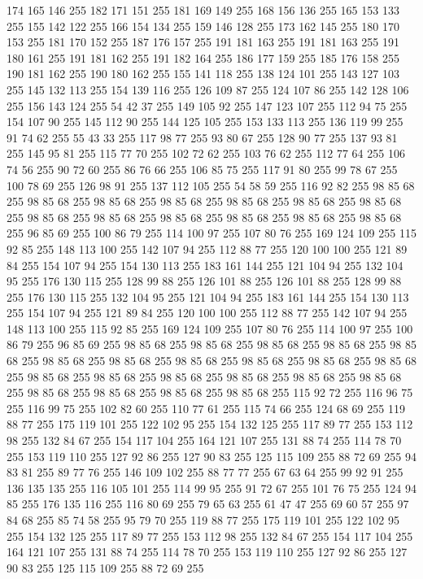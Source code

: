 174 165 146 255 182 171 151 255 181 169 149 255 168 156 136 255 165 153 133 255 155 142 122 255 166 154 134 255 159 146 128 255 173 162 145 255 180 170 153 255 181 170 152 255 187 176 157 255 191 181 163 255 191 181 163 255 191 180 161 255 191 181 162 255 191 182 164 255 186 177 159 255 185 176 158 255 190 181 162 255 190 180 162 255 155 141 118 255 138 124 101 255 143 127 103 255 145 132 113 255 154 139 116 255 126 109 87 255 124 107 86 255 142 128 106 255 156 143 124 255 54 42 37 255 149 105 92 255 147 123 107 255 112 94 75 255 154 107 90 255 145 112 90 255 144 125 105 255 153 133 113 255 136 119 99 255 91 74 62 255 55 43 33 255 117 98 77 255 93 80 67 255 128 90 77 255 137 93 81 255 145 95 81 255 115 77 70 255 102 72 62 255 103 76 62 255 112 77 64 255 106 74 56 255 90 72 60 255 86 76 66 255 106 85 75 255 117 91 80 255 99 78 67 255 100 78 69 255 126 98 91 255 137 112 105 255 54 58 59 255 116 92 82 255 98 85 68 255 98 85 68 255 98 85 68 255
98 85 68 255 98 85 68 255 98 85 68 255 98 85 68 255 98 85 68 255 98 85 68 255 98 85 68 255 98 85 68 255 98 85 68 255 98 85 68 255 96 85 69 255 100 86 79 255 114 100 97 255 107 80 76 255 169 124 109 255 115 92 85 255 148 113 100 255 142 107 94 255 112 88 77 255 120 100 100 255 121 89 84 255 154 107 94 255 154 130 113 255 183 161 144 255 121 104 94 255 132 104 95 255 176 130 115 255 128 99 88 255 126 101 88 255 126 101 88 255 128 99 88 255 176 130 115 255 132 104 95 255 121 104 94 255 183 161 144 255 154 130 113 255 154 107 94 255 121 89 84 255 120 100 100 255 112 88 77 255 142 107 94 255 148 113 100 255 115 92 85 255 169 124 109 255 107 80 76 255 114 100 97 255 100 86 79 255 96 85 69 255 98 85 68 255 98 85 68 255 98 85 68 255 98 85 68 255 98 85 68 255 98 85 68 255 98 85 68 255 98 85 68 255 98 85 68 255 98 85 68 255 98 85 68 255 98 85 68 255 98 85 68 255 98 85 68 255 98 85 68 255 98 85 68 255
98 85 68 255 98 85 68 255 98 85 68 255 98 85 68 255 98 85 68 255 115 92 72 255 116 96 75 255 116 99 75 255 102 82 60 255 110 77 61 255 115 74 66 255 124 68 69 255 119 88 77 255 175 119 101 255 122 102 95 255 154 132 125 255 117 89 77 255 153 112 98 255 132 84 67 255 154 117 104 255 164 121 107 255 131 88 74 255 114 78 70 255 153 119 110 255 127 92 86 255 127 90 83 255 125 115 109 255 88 72 69 255 94 83 81 255 89 77 76 255 146 109 102 255 88 77 77 255 67 63 64 255 99 92 91 255 136 135 135 255 116 105 101 255 114 99 95 255 91 72 67 255 101 76 75 255 124 94 85 255 176 135 116 255 116 80 69 255 79 65 63 255 61 47 47 255 69 60 57 255 97 84 68 255 85 74 58 255 95 79 70 255 119 88 77 255 175 119 101 255 122 102 95 255 154 132 125 255 117 89 77 255 153 112 98 255 132 84 67 255 154 117 104 255 164 121 107 255 131 88 74 255 114 78 70 255 153 119 110 255 127 92 86 255 127 90 83 255 125 115 109 255 88 72 69 255
